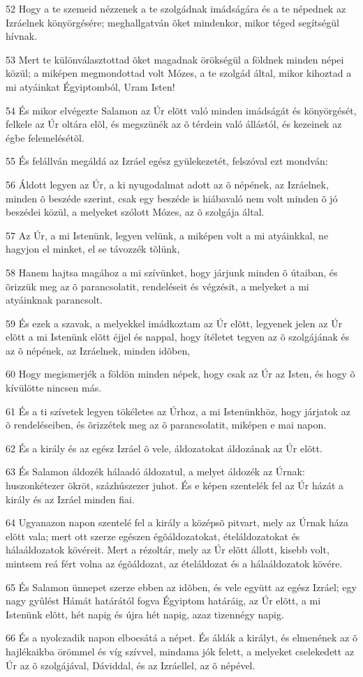 \par 52 Hogy a te szemeid nézzenek a te szolgádnak imádságára és a te népednek az Izráelnek könyörgésére; meghallgatván õket mindenkor, mikor téged segítségül hívnak.
\par 53 Mert te különválasztottad õket magadnak örökségül a földnek minden népei közül; a miképen megmondottad volt Mózes, a te szolgád által, mikor kihoztad a mi atyáinkat Égyiptomból, Uram Isten!
\par 54 És mikor elvégezte Salamon az Úr elõtt való minden imádságát és könyörgését, felkele az Úr oltára elõl, és megszünék az õ térdein való állástól, és kezeinek az égbe felemelésétõl.
\par 55 És felállván megáldá az Izráel egész gyülekezetét, felszóval ezt mondván:
\par 56 Áldott legyen az Úr, a ki nyugodalmat adott az õ népének, az Izráelnek, minden õ beszéde szerint, csak egy beszéde is hiábavaló nem volt minden õ jó beszédei közül, a melyeket szólott Mózes, az õ szolgája által.
\par 57 Az Úr, a mi Istenünk, legyen velünk, a miképen volt a mi atyáinkkal, ne hagyjon el minket, el se távozzék tõlünk,
\par 58 Hanem hajtsa magához a mi szívünket, hogy járjunk minden õ útaiban, és õrizzük meg az õ parancsolatit, rendeléseit és végzésit, a melyeket a mi atyáinknak parancsolt.
\par 59 És ezek a szavak, a melyekkel imádkoztam az Úr elõtt, legyenek jelen az Úr elõtt a mi Istenünk elõtt éjjel és nappal, hogy ítéletet tegyen az õ szolgájának és az õ népének, az Izráelnek, minden idõben,
\par 60 Hogy megismerjék a földön minden népek, hogy csak az Úr az Isten, és hogy õ kívülötte nincsen más.
\par 61 És a ti szívetek legyen tökéletes az Úrhoz, a mi Istenünkhöz, hogy járjatok az õ rendeléseiben, és õrizzétek meg az õ parancsolatit, miképen e mai napon.
\par 62 És a király és az egész Izráel õ vele, áldozatokat áldozának az Úr elõtt.
\par 63 És Salamon áldozék hálaadó áldozatul, a melyet áldozék az Úrnak: huszonkétezer ökröt, százhúszezer juhot. És e képen szentelék fel az Úr házát a király és az Izráel minden fiai.
\par 64 Ugyanazon napon szentelé fel a király a középsõ pitvart, mely az Úrnak háza elõtt vala; mert ott szerze egészen égõáldozatokat, ételáldozatokat és hálaáldozatok kövéreit. Mert a rézoltár, mely az Úr elõtt állott, kisebb volt, mintsem reá fért volna az égõáldozat, az ételáldozat és a hálaáldozatok kövére.
\par 65 És Salamon ünnepet szerze ebben az idõben, és vele együtt az egész Izráel; egy nagy gyûlést Hámát határától fogva Égyiptom határáig, az Úr elõtt, a mi Istenünk elõtt, hét napig és újra hét napig, azaz tizennégy napig.
\par 66 És a nyolczadik napon elbocsátá a népet. És áldák a királyt, és elmenének az õ hajlékaikba örömmel és víg szívvel, mindama jók felett, a melyeket cselekedett az Úr az õ szolgájával,  Dáviddal, és az Izráellel, az õ népével.

